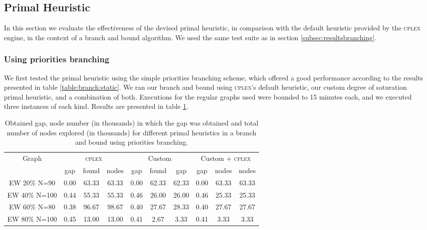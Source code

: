 
\subsection{Primal Heuristic}
\label{subsec:resultsprimal}

In this section we evaluate the effectiveness of the devised primal heuristic, in comparison with the default heuristic provided by the \textsc{cplex} engine, in the context of a branch and bound algorithm. We used the same test suite as in section \ref{subsec:resultsbranching}.

\subsubsection*{Using priorities branching}

We first tested the primal heuristic using the simple priorities branching scheme, which offered a good performance according to the results presented in table \ref{table:branch:static}. We ran our branch and bound using \textsc{cplex}'s default heuristic, our custom degree of saturation primal heuristic, and a combination of both. Executions for the regular graphs used were bounded to 15 minutes each, and we executed three instances of each kind. Results are presented in table \ref{table:primal:prios}.

\begin{table}[h]
\label{table:primal:prios}
\centering

\begin{tabular}{|c|ccc|ccc|ccc|}
\hline
\multicolumn{1}{|c|}{Graph} & \multicolumn{3}{|c|}{\textsc{cplex}} & \multicolumn{3}{|c|}{Custom} & \multicolumn{3}{|c|}{Custom + \textsc{cplex}}
\\
 & gap & found & nodes & gap & found & gap & gap & nodes & nodes
\\
\hline
EW 20\% N=90 & 0.00 & 63.33 & 63.33 & 0.00 & 62.33 & 62.33 & 0.00 & 63.33 & 63.33
\\
EW 40\% N=100 & 0.44 & 55.33 & 55.33 & 0.46 & 26.00 & 26.00 & 0.46 & 25.33 & 25.33
\\
EW 60\% N=80 & 0.38 & 96.67 & 98.67 & 0.40 & 27.67 & 28.33 & 0.40 & 27.67 & 27.67
\\
EW 80\% N=100 & 0.45 & 13.00 & 13.00 & 0.41 & 2.67 & 3.33 & 0.41 & 3.33 & 3.33
\\
\hline 
 \end{tabular}

\caption{Obtained gap, node number (in thousands) in which the gap was obtained and total number of nodes explored (in thousands) for different primal heuristics in a branch and bound using priorities branching.}

\end{table}

